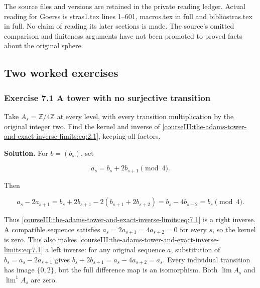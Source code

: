 The source files and versions are retained in the private reading ledger. Actual reading for Goerss is stras1.tex lines 1--601, macros.tex in full and bibliostras.tex in full. No claim of reading its later sections is made. The source's omitted comparison and finiteness arguments have not been promoted to proved facts about the original sphere.

\subsection{Two worked exercises}
\label{courseIII:the-adams-tower-and-exact-inverse-limits:adams-worked-exercises}

\label{courseIII:the-adams-tower-and-exact-inverse-limits:section-7}

\subsubsection{Exercise 7.1 A tower with no surjective transition}
\label{courseIII:the-adams-tower-and-exact-inverse-limits:exercise-7.1}

\label{courseIII:adams-tower:7.1}

Take \(A_s=\mathbb Z/4\mathbb Z\) at every level, with every transition multiplication by the original integer two. Find the kernel and inverse of \eqref{courseIII:the-adams-tower-and-exact-inverse-limits:eq:2.1}, keeping all factors.

\textbf{Solution.} For \(b=(b_s)\), set

\begin{equation}
a_s=b_s+2b_{s+1}\pmod4.
 \label{courseIII:the-adams-tower-and-exact-inverse-limits:eq:7.1}
\end{equation}

Then

\begin{equation}
a_s-2a_{s+1}
 =b_s+2b_{s+1}-2(b_{s+1}+2b_{s+2})
 =b_s-4b_{s+2}=b_s\pmod4.
 \label{courseIII:the-adams-tower-and-exact-inverse-limits:eq:7.2}
\end{equation}

Thus \eqref{courseIII:the-adams-tower-and-exact-inverse-limits:eq:7.1} is a right inverse. A compatible sequence satisfies
\(a_s=2a_{s+1}=4a_{s+2}=0\) for every \(s\), so the kernel is zero. This also makes \eqref{courseIII:the-adams-tower-and-exact-inverse-limits:eq:7.1} a left inverse: for any original sequence \(a\), substitution of \(b_s=a_s-2a_{s+1}\) gives
\(b_s+2b_{s+1}=a_s-4a_{s+2}=a_s\).
Every individual transition has image \(\{0,2\}\), but the full difference map is an isomorphism. Both \(\lim A_s\) and \(\lim^1 A_s\) are zero.

